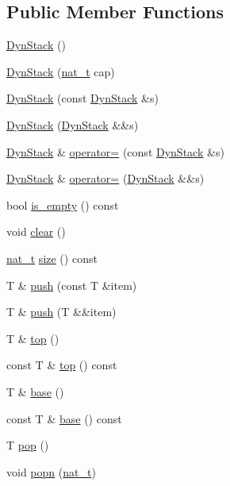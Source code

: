 \subsection*{Public Member Functions}
\begin{DoxyCompactItemize}
\item 
\hyperlink{class_designar_1_1_dyn_stack_a974a328c42eeb04114249c321a7d2ebe}{Dyn\+Stack} ()
\item 
\hyperlink{class_designar_1_1_dyn_stack_afe8f19b00f9c0cb21ea2d64fedadcb5e}{Dyn\+Stack} (\hyperlink{namespace_designar_aa72662848b9f4815e7bf31a7cf3e33d1}{nat\+\_\+t} cap)
\item 
\hyperlink{class_designar_1_1_dyn_stack_a4a28588893016f554cd8ea21b37e2c5f}{Dyn\+Stack} (const \hyperlink{class_designar_1_1_dyn_stack}{Dyn\+Stack} \&s)
\item 
\hyperlink{class_designar_1_1_dyn_stack_a8a15a70c98b19554d73037118fa8eed9}{Dyn\+Stack} (\hyperlink{class_designar_1_1_dyn_stack}{Dyn\+Stack} \&\&s)
\item 
\hyperlink{class_designar_1_1_dyn_stack}{Dyn\+Stack} \& \hyperlink{class_designar_1_1_dyn_stack_a95c3464bba2e4c2393ada749ab4d9248}{operator=} (const \hyperlink{class_designar_1_1_dyn_stack}{Dyn\+Stack} \&s)
\item 
\hyperlink{class_designar_1_1_dyn_stack}{Dyn\+Stack} \& \hyperlink{class_designar_1_1_dyn_stack_aa5b875ca2b2a6ce501a91c79d5857166}{operator=} (\hyperlink{class_designar_1_1_dyn_stack}{Dyn\+Stack} \&\&s)
\item 
bool \hyperlink{class_designar_1_1_dyn_stack_ae0c03ed9771729e3773128868fb7afe5}{is\+\_\+empty} () const
\item 
void \hyperlink{class_designar_1_1_dyn_stack_aab024478a38633aeb3d79e2ddcbd1958}{clear} ()
\item 
\hyperlink{namespace_designar_aa72662848b9f4815e7bf31a7cf3e33d1}{nat\+\_\+t} \hyperlink{class_designar_1_1_dyn_stack_a4c15622a5283c072287a7dfdd6c4bd2d}{size} () const
\item 
T \& \hyperlink{class_designar_1_1_dyn_stack_a07d7d76d087e7b9dc287a7b2acd02fc6}{push} (const T \&item)
\item 
T \& \hyperlink{class_designar_1_1_dyn_stack_a1eff6c891fd3800c6aa55f35e14e4f88}{push} (T \&\&item)
\item 
T \& \hyperlink{class_designar_1_1_dyn_stack_a33e8c623bae518ed88cdee01602febb0}{top} ()
\item 
const T \& \hyperlink{class_designar_1_1_dyn_stack_a497eb06d2cb8280d031586a913b1317c}{top} () const
\item 
T \& \hyperlink{class_designar_1_1_dyn_stack_aa07528cd0ef77519ca5b5694bed9695d}{base} ()
\item 
const T \& \hyperlink{class_designar_1_1_dyn_stack_affe0e56802ac0c982f598e2155bf4a46}{base} () const
\item 
T \hyperlink{class_designar_1_1_dyn_stack_ac3e7235449ffb9fc0ac96ba0b081d2ed}{pop} ()
\item 
void \hyperlink{class_designar_1_1_dyn_stack_a161b319e52448a4f824b036a9f7c6cca}{popn} (\hyperlink{namespace_designar_aa72662848b9f4815e7bf31a7cf3e33d1}{nat\+\_\+t})
\end{DoxyCompactItemize}


